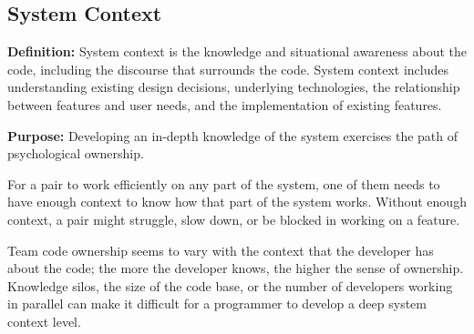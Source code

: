 

\subsection{System Context}
\textbf{Definition:} System context is the knowledge and situational awareness about the code, including the discourse that surrounds the code. System context includes understanding existing design decisions, underlying technologies, the relationship between features and user needs, and the implementation of existing features.

\textbf{Purpose:} Developing an in-depth knowledge of the system exercises the  path of psychological ownership.

For a pair to work efficiently on any part of the system, one of them needs to have enough context to know how that part of the system works. Without enough context, a pair might struggle, slow down, or be blocked in working on a feature.

Team code ownership seems to vary with the context that the developer has about the code; the more the developer knows, the higher the sense of ownership. Knowledge silos, the size of the code base, or the number of developers working in parallel can make it difficult for a programmer to develop a deep system context level.

